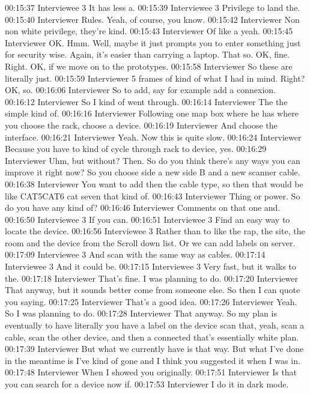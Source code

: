 00:15:37 Interviewee 3
It has less a.
00:15:39 Interviewee 3
Privilege to land the.
00:15:40 Interviewer
Rules. Yeah, of course, you know.
00:15:42 Interviewer
Non non white privilege, they're kind.
00:15:43 Interviewer
Of like a yeah.
00:15:45 Interviewer
OK. Hmm. Well, maybe it just prompts you to enter something just for security wise. Again, it's easier than carrying a laptop. That so. OK, fine. Right. OK, if we move on to the prototypes.
00:15:58 Interviewer
So these are literally just.
00:15:59 Interviewer
5 frames of kind of what I had in mind. Right? OK, so.
00:16:06 Interviewer
So to add, say for example add a connexion.
00:16:12 Interviewer
So I kind of went through.
00:16:14 Interviewer
The the simple kind of.
00:16:16 Interviewer
Following one map box where he has where you choose the rack, choose a device.
00:16:19 Interviewer
And choose the interface.
00:16:21 Interviewer
Yeah. Now this is quite slow.
00:16:24 Interviewer
Because you have to kind of cycle through rack to device, yes.
00:16:29 Interviewer
Uhm, but without? Then. So do you think there's any ways you can improve it right now? So you choose side a new side B and a new scanner cable.
00:16:38 Interviewer
You want to add then the cable type, so then that would be like CAT5CAT6 cat seven that kind of.
00:16:43 Interviewer
Thing or power. So do you have any kind of?
00:16:46 Interviewer
Comments on that one and.
00:16:50 Interviewee 3
If you can.
00:16:51 Interviewee 3
Find an easy way to locate the device.
00:16:56 Interviewee 3
Rather than to like the rap, the site, the room and the device from the Scroll down list. Or we can add labels on server.
00:17:09 Interviewee 3
And scan with the same way as cables.
00:17:14 Interviewee 3
And it could be.
00:17:15 Interviewee 3
Very fast, but it walks to the.
00:17:18 Interviewer
That's fine. I was planning to do.
00:17:20 Interviewer
That anyway, but it sounds better come from someone else. So then I can quote you saying.
00:17:25 Interviewer
That's a good idea.
00:17:26 Interviewer
Yeah. So I was planning to do.
00:17:28 Interviewer
That anyway. So my plan is eventually to have literally you have a label on the device scan that, yeah, scan a cable, scan the other device, and then a connected that's essentially white plan.
00:17:39 Interviewer
But what we currently have is that way. But what I've done in the meantime is I've kind of gone and I think you suggested it when I was in.
00:17:48 Interviewer
When I showed you originally.
00:17:51 Interviewer
Is that you can search for a device now if.
00:17:53 Interviewer
I do it in dark mode.

